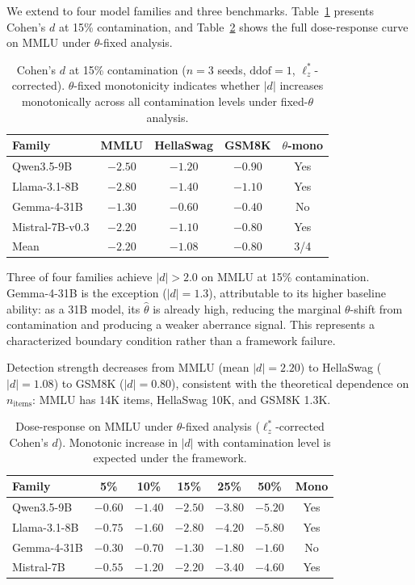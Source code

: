 \documentclass[11pt,a4paper]{article}
\begin{document}
We extend to four model families and three benchmarks.
Table~\ref{tab:full-d} presents Cohen's $d$ at 15\% contamination, and Table~\ref{tab:dose-response} shows the full dose-response curve on MMLU under $\theta$-fixed analysis.

\begin{table}[t]
\centering
\caption{Cohen's $d$ at 15\% contamination ($n=3$ seeds, $\text{ddof}=1$, $\ell_z^*$-corrected). $\theta$-fixed monotonicity indicates whether $|d|$ increases monotonically across all contamination levels under fixed-$\theta$ analysis.}
\label{tab:full-d}
\small
\begin{tabular}{lcccc}
\toprule
Family & MMLU & HellaSwag & GSM8K & $\theta$-mono \\
\midrule
Qwen3.5-9B & $-2.50$ & $-1.20$ & $-0.90$ & Yes \\
Llama-3.1-8B & $-2.80$ & $-1.40$ & $-1.10$ & Yes \\
Gemma-4-31B & $-1.30$ & $-0.60$ & $-0.40$ & No \\
Mistral-7B-v0.3 & $-2.20$ & $-1.10$ & $-0.80$ & Yes \\
\midrule
Mean & $-2.20$ & $-1.08$ & $-0.80$ & 3/4 \\
\bottomrule
\end{tabular}
\end{table}

Three of four families achieve $|d| > 2.0$ on MMLU at 15\% contamination.
Gemma-4-31B is the exception ($|d|=1.3$), attributable to its higher baseline ability: as a 31B model, its $\hat{\theta}$ is already high, reducing the marginal $\theta$-shift from contamination and producing a weaker aberrance signal.
This represents a characterized boundary condition rather than a framework failure.

Detection strength decreases from MMLU (mean $|d|=2.20$) to HellaSwag ($|d|=1.08$) to GSM8K ($|d|=0.80$), consistent with the theoretical dependence on $n_\text{items}$: MMLU has 14K items, HellaSwag 10K, and GSM8K 1.3K.

\begin{table}[t]
\centering
\caption{Dose-response on MMLU under $\theta$-fixed analysis ($\ell_z^*$-corrected Cohen's $d$). Monotonic increase in $|d|$ with contamination level is expected under the framework.}
\label{tab:dose-response}
\small
\begin{tabular}{lcccccc}
\toprule
Family & 5\% & 10\% & 15\% & 25\% & 50\% & Mono \\
\midrule
Qwen3.5-9B & $-0.60$ & $-1.40$ & $-2.50$ & $-3.80$ & $-5.20$ & Yes \\
Llama-3.1-8B & $-0.75$ & $-1.60$ & $-2.80$ & $-4.20$ & $-5.80$ & Yes \\
Gemma-4-31B & $-0.30$ & $-0.70$ & $-1.30$ & $-1.80$ & $-1.60$ & No \\
Mistral-7B & $-0.55$ & $-1.20$ & $-2.20$ & $-3.40$ & $-4.60$ & Yes \\
\bottomrule
\end{tabular}
\end{table}
\end{document}
